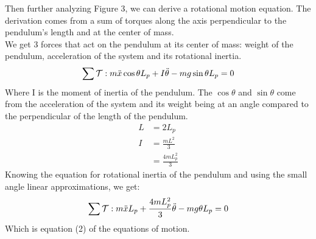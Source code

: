\documentclass[11pt, twoside, letterpaper]{article}   	%
\begin{document}
Then further analyzing Figure 3, we can derive a rotational motion equation. The derivation
comes from a sum of torques along the axis perpendicular to the pendulum's length and at the
center of mass. \\
We get 3 forces that act on the pendulum at its center of mass: weight of the pendulum, acceleration
of the system and its rotational inertia.\\
\begin{align*}
\sum \mathcal{T}: m\ddot{x}\cos{\theta}L_p+I\ddot{\theta}-mg\sin{\theta}L_p=0
\end{align*}
Where I is the moment of inertia of the pendulum. The $\cos{\theta}$ and $\sin{\theta}$ come from the
acceleration of the system and its weight being at an angle compared to the perpendicular of the length of the pendulum.\\
\begin{align*}
L&=2L_p\\
I&=\frac{mL^2}{3}\\
&=\frac{4mL_p^2}{3}
\end{align*}
Knowing the equation for rotational inertia of the pendulum and using the small angle linear approximations, we get:\\
\begin{equation}
\sum \mathcal{T}: m\ddot{x}L_p + \frac{4mL_p^2}{3}\ddot{\theta} - mg\theta L_p=0
\end{equation}
Which is equation (2) of the equations of motion.
\end{document}

